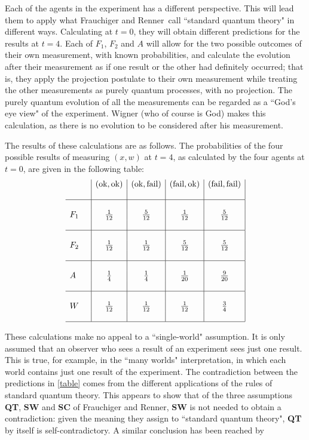 \documentclass[12pt,a4paper,reqno]{article}
\newcommand{\ok}{\text{ok}}
\newcommand{\fail}{\text{fail}}
\renewcommand{\(}{\left(}
\renewcommand{\)}{\right)}
\renewcommand{\.}{\centerdot}
\newcommand{\1}{\mathbf{1}}
\newcommand{\<}{\langle}
\renewcommand{\>}{\rangle}
\newcommand{\FR}{Frauchiger and Renner}
\theoremstyle{definition}
\theoremstyle{remark}
\numberwithin{equation}{section}
\begin{document}
Each of the agents in the experiment has a different perspective. This will lead them to apply what \FR \ call ``standard quantum theory" in different ways. Calculating at $t = 0$, they will obtain different predictions for the results at $t = 4$. Each of $F_1$, $F_2$ and $A$ will allow for the two possible outcomes of their own measurement, with known probabilities, and calculate the evolution after their measurement as if one result or the other had definitely occurred; that is, they apply the projection postulate to their own measurement while treating the other measurements as purely quantum processes, with no projection. The purely quantum evolution of all the measurements can be regarded as a ``God's eye view" of the experiment. Wigner (who of course is God) makes this calculation, as there is no evolution to be considered after his measurement.

The results of these calculations are as follows. The probabilities of the four possible results of measuring $(x,w)$ at $t = 4$, as calculated by the four agents at $t = 0$, are given in the following table:
\[\label{table}
\begin{array}{l|c|c|c|c|}{}& (\ok,\ok) & (\ok,\fail) & (\fail,\ok) & (\fail,\fail) \\&&&&\\\hline&&&&\\
F_1\quad  &\frac{1}{12}&\frac{5}{12}&\frac{1}{12}&\frac{5}{12}\\&&&&\\\hline &&&&\\
F_2\quad &\frac{1}{12}&\frac{1}{12}&\frac{5}{12}&\frac{5}{12}\\&&&&\\ \hline &&&&\\
A\quad &\frac{1}{4}&\frac{1}{4}&\frac{1}{20}&\frac{9}{20}\\&&&&\\\hline &&&&\\
W\quad &\frac{1}{12}&\frac{1}{12}&\frac{1}{12}&\frac{3}{4}\\&&&&\\\hline
\end{array}
\]

These calculations make no appeal to a ``single-world" assumption. It is only assumed that an observer who sees a result of an experiment sees just one result. This is true, for example, in the ``many worlds" interpretation, in which each world contains just one result of the experiment. The contradiction between the predictions in \eqref{table} comes from the different applications of the rules of standard quantum theory. This appears to show that of the three assumptions {\bf QT}, {\bf SW} and {\bf SC} of \FR, {\bf SW} is not needed to obtain a contradiction: given the meaning they assign to ``standard quantum theory", {\bf QT} by itself is self-contradictory. A similar conclusion has been reached by \cite{GertrudeStein}
\end{document}
